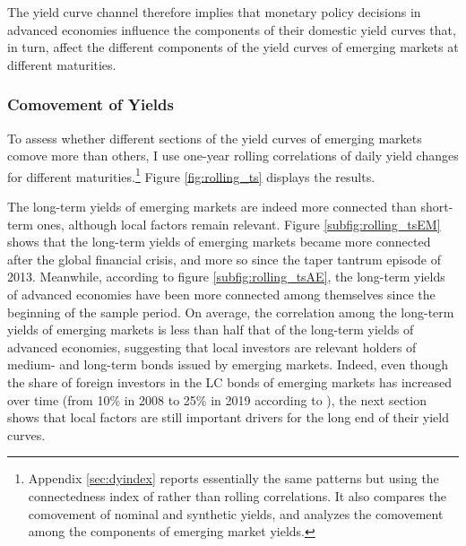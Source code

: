 {The yield curve channel therefore implies that monetary policy decisions in advanced economies influence the components of their domestic yield curves that, in turn, affect the different components of the yield curves of emerging markets at different maturities. 


\subsubsection{Comovement of Yields} \label{sec:Comovement}

To assess whether different sections of the yield curves of emerging markets comove more than others, I use one-year rolling correlations of daily yield changes for different maturities.\footnote{ Appendix \ref{sec:dyindex} reports essentially the same patterns but using the connectedness index of \cite{DieboldYilmaz:2014} rather than rolling correlations. It also compares the comovement of nominal and synthetic yields, and analyzes the comovement among the components of emerging market yields.} Figure \ref{fig:rolling_ts} displays the results.



The long-term yields of emerging markets are indeed more connected than short-term ones, although local factors remain relevant.
Figure \ref{subfig:rolling_tsEM} shows that the long-term yields of emerging markets became more connected after the global financial crisis, and more so since the taper tantrum episode of 2013. 
Meanwhile, according to figure \ref{subfig:rolling_tsAE}, the long-term yields of advanced economies have been more connected among themselves since the beginning of the sample period. 
On average, the correlation among the long-term yields of emerging markets is less than half that of the long-term yields of advanced economies, suggesting that local investors are relevant holders of medium- and long-term bonds issued by emerging markets. Indeed, even though the share of foreign investors in the LC bonds of emerging markets has increased over time (from 10\% in 2008 to 25\% in 2019 according to \cite{KolasaWesolowski:2020}), the next section shows that local factors are still important drivers for the long end of their yield curves.

}
